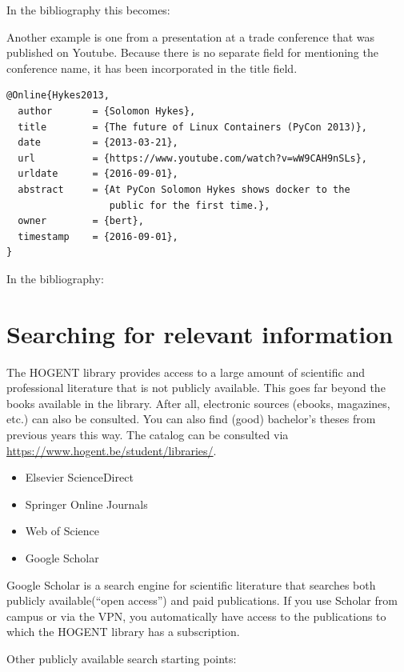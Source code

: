 In the bibliography this becomes: 

Another example is one from a presentation at a trade conference that was published on Youtube. Because there is no separate field for mentioning the conference name, it has been incorporated in the title field.

\begin{verbatim}
@Online{Hykes2013,
  author       = {Solomon Hykes},
  title        = {The future of Linux Containers (PyCon 2013)},
  date         = {2013-03-21},
  url          = {https://www.youtube.com/watch?v=wW9CAH9nSLs},
  urldate      = {2016-09-01},
  abstract     = {At PyCon Solomon Hykes shows docker to the
                  public for the first time.},
  owner        = {bert},
  timestamp    = {2016-09-01},
}
\end{verbatim}

In the bibliography: 

\section{Searching for relevant information}
\label{sec:searchingforrelevantinformation}

The HOGENT library provides access to a large amount of scientific and professional literature that is not publicly available. This goes far beyond the books available in the library. After all, electronic sources (ebooks, magazines, etc.) can also be consulted. You can also find (good) bachelor's theses from previous years this way. The catalog can be consulted via \url{https://www.hogent.be/student/libraries/}.

\begin{itemize}
  \item Elsevier ScienceDirect
  \item Springer Online Journals
  \item Web of Science
  \item Google Scholar
\end{itemize}

Google Scholar is a search engine for scientific literature that searches both publicly available(``open access'') and paid publications. If you use Scholar from campus or via the VPN, you automatically have access to the publications to which the HOGENT library has a subscription.

Other publicly available search starting points:

